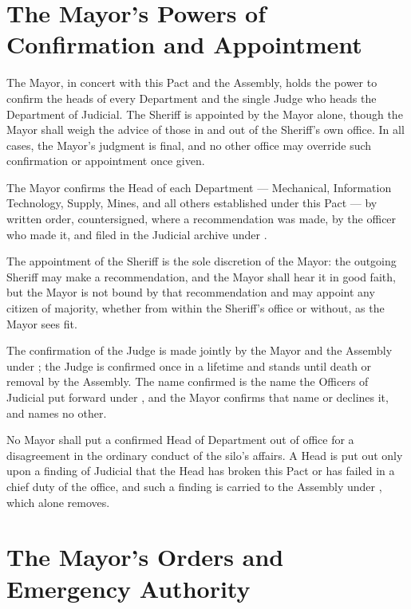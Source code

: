 \section{The Mayor's Powers of Confirmation and Appointment}
\label{sec:mayor:mayors-powers-of-confirmation-and-appointment}

The Mayor, in concert with this Pact and the Assembly, holds the power to confirm the heads of every Department and the single Judge who heads the Department of Judicial. The Sheriff is appointed by the Mayor alone, though the Mayor shall weigh the advice of those in and out of the Sheriff's own office. In all cases, the Mayor's judgment is final, and no other office may override such confirmation or appointment once given.

\begin{clauses}
\item The Mayor confirms the Head of each Department --- Mechanical, Information Technology, Supply, Mines, and all others established under this Pact --- by written order, countersigned, where a recommendation was made, by the officer who made it, and filed in the Judicial archive under .
\item The appointment of the Sheriff is the sole discretion of the Mayor: the outgoing Sheriff may make a recommendation, and the Mayor shall hear it in good faith, but the Mayor is not bound by that recommendation and may appoint any citizen of majority, whether from within the Sheriff's office or without, as the Mayor sees fit.
\item The confirmation of the Judge is made jointly by the Mayor and the Assembly under ; the Judge is confirmed once in a lifetime and stands until death or removal by the Assembly. The name confirmed is the name the Officers of Judicial put forward under , and the Mayor confirms that name or declines it, and names no other.
\item No Mayor shall put a confirmed Head of Department out of office for a disagreement in the ordinary conduct of the silo's affairs. A Head is put out only upon a finding of Judicial that the Head has broken this Pact or has failed in a chief duty of the office, and such a finding is carried to the Assembly under , which alone removes.
\end{clauses}

\section{The Mayor's Orders and Emergency Authority}
\label{sec:mayor:mayors-orders-and-emergency-authority}

